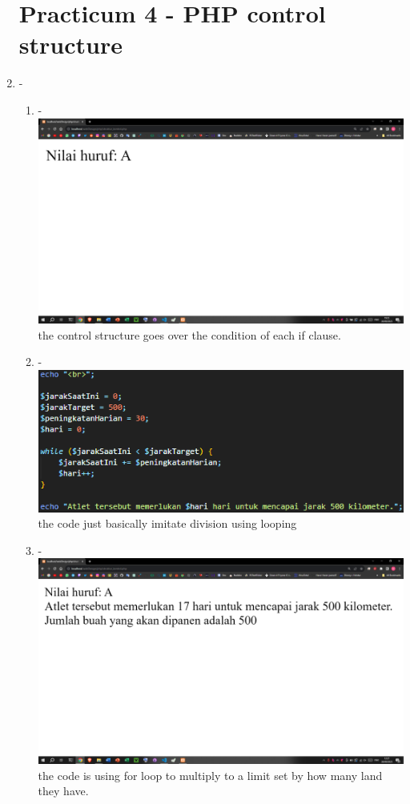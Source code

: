 \documentclass[12pt,titlepage]{article}
\begin{document}
\begin{enumerate}[label*=\arabic*.]
    \section*{Practicum 4  - PHP control structure}
    \item -
    \begin{enumerate}[label*=\arabic*.]
        \item - \\ \includegraphics[width=.8\textwidth]{images/figures/fig8.png} \\ the control structure goes over the condition of each if clause.
        \item - \\ \includegraphics[width=.8\textwidth]{images/figures/fig9.png} \\ the code just basically imitate division using looping
        \newpage
        \item - \\ \includegraphics[width=.8\textwidth]{images/figures/fig10.png} \\ the code is using for loop to multiply to a limit set by how many land they have.

\end{enumerate}
\end{enumerate}
\end{document}
